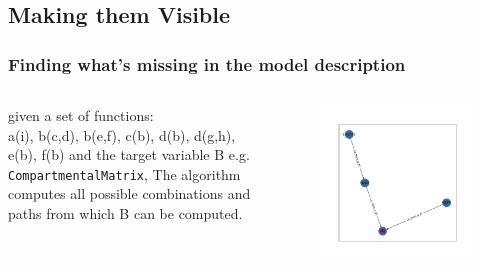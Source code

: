 \documentclass[unknownkeysallowed,usepdftitle=false]{beamer}
\begin{document}
\subsection{Making them Visible }
\begin{frame}
  \frametitle{Finding what's missing in the model description }
\begin{columns}
  \begin{column}{0.3\textwidth}
  given a set of functions:\\
        a(i), b(c,d), b(e,f), c(b),
        d(b), d(g,h),
        e(b),
        f(b)
  and the target variable {\color{red}B}
  e.g. \texttt{CompartmentalMatrix},
  The algorithm computes all possible combinations
  and paths from which {\color{red}B} can be computed.
  \end{column}
  \begin{column}{0.7\textwidth}
      \begin{center}
      \begin{figure}
  	\includegraphics[height=.9\textheight]{StartNodes.pdf}
      \end{figure}
       \end{center}
  \end{column}
\end{columns}
\end{frame}
\end{document}
